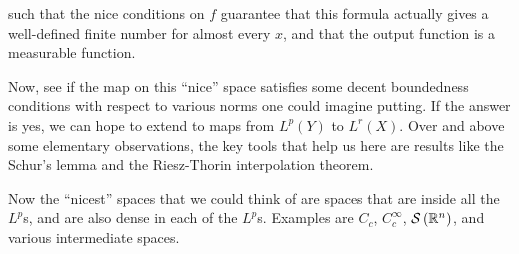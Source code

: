 \documentclass[a4paper]{amsart}
\newcommand{\schwarz}[1]{\mathcal{S}\left(#1\right)}
\begin{document}
such that the nice conditions on $f$ guarantee that this formula
actually gives a well-defined finite number for almost every $x$, and
that the output function is a measurable function.

Now, see if the map on this ``nice'' space satisfies some decent
boundedness conditions with respect to various norms one could imagine
putting. If the answer is yes, we can hope to extend to maps from
$L^p(Y)$ to $L^r(X)$. Over and above some elementary observations, the
key tools that help us here are results like the Schur's lemma and the
Riesz-Thorin interpolation theorem.

Now the ``nicest'' spaces that we could think of are spaces that are
inside all the $L^p$s, and are also dense in each of the
$L^p$s. Examples are $C_c$, $C_c^\infty$, $\schwarz{\R^n}$, and
various intermediate spaces.

 \printindex
\end{document}
